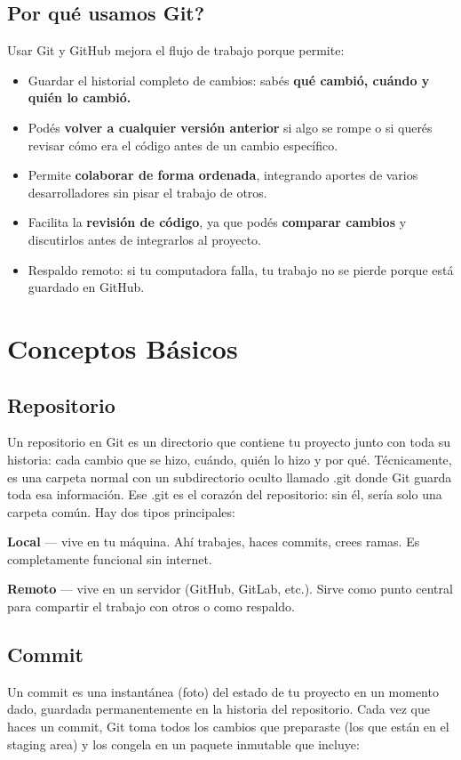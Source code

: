 \documentclass{apuntes_itsv}
\begin{document}
\section{Por qué usamos Git?}
Usar Git y GitHub mejora el flujo de trabajo porque permite:
\begin{itemize}[leftmargin=*]
  \item Guardar el historial completo de cambios: sabés \textbf{qué cambió, cuándo y quién lo cambió.}
  \item Podés \textbf{volver a cualquier versión anterior} si algo se rompe o si querés revisar cómo era
     el código antes de un cambio específico.
  \item Permite \textbf{colaborar de forma ordenada}, integrando aportes de varios desarrolladores sin pisar el trabajo de otros.
  \item Facilita la \textbf{revisión de código}, ya que podés \textbf{comparar cambios} y discutirlos antes de integrarlos al proyecto.
  \item Respaldo remoto: si tu computadora falla, tu trabajo no se pierde porque está guardado en GitHub.
\end{itemize}

\chapter{Conceptos Básicos}
\section{Repositorio}
Un repositorio en Git es un directorio que contiene tu proyecto junto con toda su historia: cada
cambio que se hizo, cuándo, quién lo hizo y por qué.
Técnicamente, es una carpeta normal con un subdirectorio oculto llamado .git donde Git guarda toda
esa información. Ese .git es el corazón del repositorio: sin él, sería solo una carpeta común.
Hay dos tipos principales:

\textbf{Local} — vive en tu máquina. Ahí trabajes, haces commits, crees ramas. Es completamente funcional sin internet.

\textbf{Remoto} — vive en un servidor (GitHub, GitLab, etc.). Sirve como punto central para compartir el trabajo con otros o como respaldo.

\section{Commit}
Un commit es una instantánea (foto) del estado de tu proyecto en un momento dado, guardada permanentemente
en la historia del repositorio.
Cada vez que haces un commit, Git toma todos los cambios que preparaste (los que están en el staging area) y
los congela en un paquete inmutable que incluye:
\end{document}
